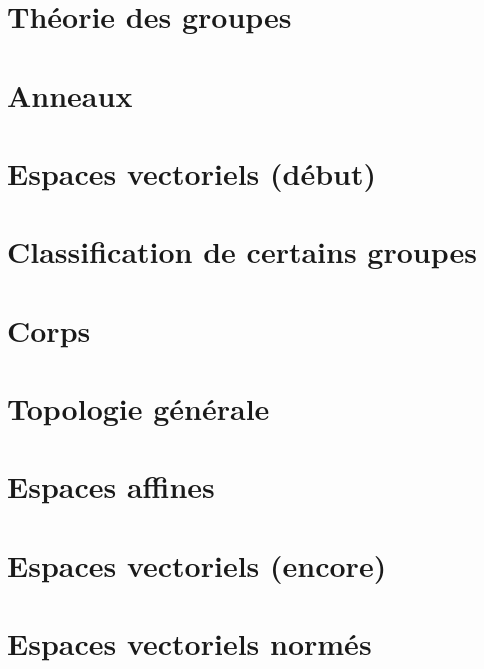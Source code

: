 \documentclass[a4paper,twoside,11pt]{book}
\begin{document}
\chapter{Théorie des groupes}



\chapter{Anneaux}



\chapter{Espaces vectoriels (début)}


\chapter{Classification de certains groupes}


\chapter{Corps}




\chapter{Topologie générale}





\chapter{Espaces affines}


\chapter{Espaces vectoriels (encore)}








\chapter{Espaces vectoriels normés}


\end{document}
